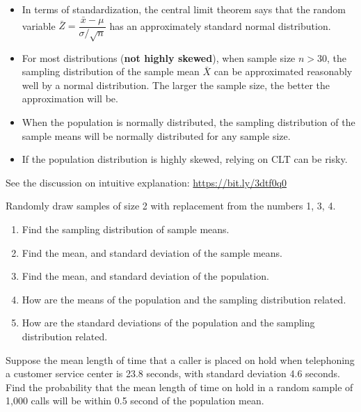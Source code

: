 \begin{remark}
  \begin{itemize}
    \item 
  In terms of standardization, the central limit
    theorem says that the random variable
    \(\bar{Z}=\dfrac{\bar{x}-\mu}{\sigma/\sqrt{n}}\) has an approximately
    standard normal distribution.
  \item
    For most distributions (\textbf{not highly skewed}), when sample size \(n>30\),
    the sampling distribution of the sample mean \(\bar{X}\) can be
    approximated reasonably well by a normal distribution. The larger the
    sample size, the better the approximation will be.
  \item
    When the population is normally distributed, the sampling distribution of the sample means will be normally distributed for any sample size.
  \item
    If the population distribution is highly skewed, relying on CLT can be
    risky.
  \end{itemize}
\end{remark} 

See the discussion on intuitive explanation:
\url{https://bit.ly/3dtf0q0}

\begin{example}

Randomly draw samples of size 2 with replacement from the numbers 1, 3,
4.

\begin{enumerate}
\item
  Find the sampling distribution of sample means.
\item
  Find the mean, and standard deviation of the sample means.
\item
  Find the mean, and standard deviation of the population.
\item
  How are the means of the population and the sampling distribution
  related.
\item
  How are the standard deviations of the population and the sampling
  distribution related.
\end{enumerate}

\end{example}

\begin{example}

Suppose the mean length of time that a caller is placed on hold when
telephoning a customer service center is 23.8 seconds, with standard
deviation 4.6 seconds. Find the probability that the mean length of time
on hold in a random sample of 1,000 calls will be within 0.5 second of
the population mean.

\end{example}

